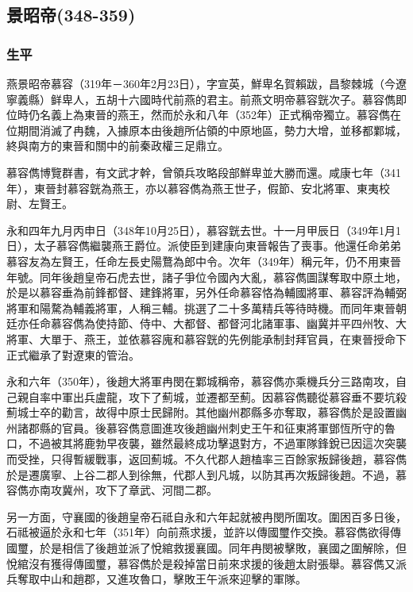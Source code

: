 
\subsection{景昭帝\tiny(348-359)}

\subsubsection{生平}

燕景昭帝慕容（319年－360年2月23日），字宣英，鮮卑名賀賴跋，昌黎棘城（今遼寧義縣）鲜卑人，五胡十六國時代前燕的君主。前燕文明帝慕容皝次子。慕容儁即位時仍名義上為東晉的燕王，然而於永和八年（352年）正式稱帝獨立。慕容儁在位期間消滅了冉魏，入據原本由後趙所佔領的中原地區，勢力大增，並移都鄴城，終與南方的東晉和關中的前秦政權三足鼎立。

慕容儁博覽群書，有文武才幹，曾領兵攻略段部鮮卑並大勝而還。咸康七年（341年），東晉封慕容皝為燕王，亦以慕容儁為燕王世子，假節、安北將軍、東夷校尉、左賢王。

永和四年九月丙申日（348年10月25日），慕容皝去世。十一月甲辰日（349年1月1日），太子慕容儁繼襲燕王爵位。派使臣到建康向東晉報告了喪事。他還任命弟弟慕容友為左賢王，任命左長史陽鶩為郎中令。次年（349年）稱元年，仍不用東晉年號。同年後趙皇帝石虎去世，諸子爭位令國內大亂，慕容儁圖謀奪取中原土地，於是以慕容垂為前鋒都督、建鋒將軍，另外任命慕容恪為輔國將軍、慕容評為輔弼將軍和陽騖為輔義將軍，人稱三輔。挑選了二十多萬精兵等待時機。而同年東晉朝廷亦任命慕容儁為使持節、侍中、大都督、都督河北諸軍事、幽冀并平四州牧、大將軍、大單于、燕王，並依慕容廆和慕容皝的先例能承制封拜官員，在東晉授命下正式繼承了對遼東的管治。

永和六年（350年），後趙大將軍冉閔在鄴城稱帝，慕容儁亦乘機兵分三路南攻，自己親自率中軍出兵盧龍，攻下了薊城，並遷都至薊。因慕容儁聽從慕容垂不要坑殺薊城士卒的勸言，故得中原士民歸附。其他幽州郡縣多亦奪取，慕容儁於是設置幽州諸郡縣的官員。後慕容儁意圖進攻後趙幽州刺史王午和征東將軍鄧恆所守的魯口，不過被其將鹿勃早夜襲，雖然最終成功擊退對方，不過軍隊鋒銳已因這次突襲而受挫，只得暫緩戰事，返回薊城。不久代郡人趙榼率三百餘家叛歸後趙，慕容儁於是遷廣寧、上谷二郡人到徐無，代郡人到凡城，以防其再次叛歸後趙。不過，慕容儁亦南攻冀州，攻下了章武、河間二郡。

另一方面，守襄國的後趙皇帝石祗自永和六年起就被冉閔所圍攻。圍困百多日後，石祗被逼於永和七年（351年）向前燕求援，並許以傳國璽作交換。慕容儁欲得傳國璽，於是相信了後趙並派了悅綰救援襄國。同年冉閔被擊敗，襄國之圍解除，但悅綰沒有獲得傳國璽，慕容儁於是殺掉當日前來求援的後趙太尉張舉。慕容儁又派兵奪取中山和趙郡，又進攻魯口，擊敗王午派來迎擊的軍隊。

